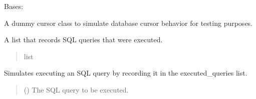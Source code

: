 \documentclass[letterpaper,10pt,english]{sphinxmanual}
\begin{document}
\begin{fulllineitems}
\label{\detokenize{test.data_storage:test.data_storage.test_create_table.DummyCursor}}
\pysigstartsignatures
\pysigline
{}
\pysigstopsignatures
\sphinxAtStartPar
Bases: 

\sphinxAtStartPar
A dummy cursor class to simulate database cursor behavior for testing purposes.

\begin{fulllineitems}
\label{\detokenize{test.data_storage:test.data_storage.test_create_table.DummyCursor.executed_queries}}
\pysigstartsignatures
\pysigline
{}
\pysigstopsignatures
\sphinxAtStartPar
A list that records SQL queries that were executed.
\begin{quote}\begin{description}
\sphinxAtStartPar
list

\end{description}\end{quote}

\end{fulllineitems}


\begin{fulllineitems}
\label{\detokenize{test.data_storage:test.data_storage.test_create_table.DummyCursor.execute}}
\pysigstartsignatures
\pysiglinewithargsret
{}
{}
{}
\pysigstopsignatures
\sphinxAtStartPar
Simulates executing an SQL query by recording it in the executed\_queries list.
\begin{quote}\begin{description}
\sphinxAtStartPar
{} () \textendash{} The SQL query to be executed.

\end{description}\end{quote}

\end{fulllineitems}


\end{fulllineitems}
\end{document}
